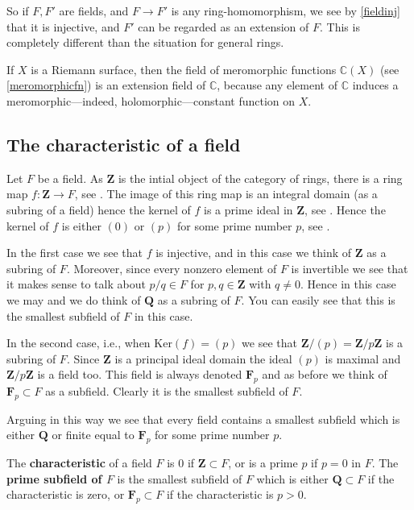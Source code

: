So if $F, F'$ are fields, and $F \to F'$ is any ring-homomorphism, we see by 
\cref{fieldinj} that it is injective, and $F'$ can be regarded as an extension
of $F$.
This is completely different than the situation for general rings. 


\begin{example} 
If $X$ is a Riemann surface, then the field of meromorphic functions
$\mathbb{C}(X)$ (see \cref{meromorphicfn}) is an extension field of
$\mathbb{C}$, because any element of $\mathbb{C}$ induces a
meromorphic---indeed, holomorphic---constant function on $X$.
\end{example} 



\subsection{The characteristic of a field}
\label{more-fields}

Let $F$ be a field. As $\mathbf{Z}$ is the intial object of the category of
rings, there is a ring map $f : \mathbf{Z} \to F$, see
.
The image of this ring map is an integral domain (as a subring of a field)
hence the kernel of $f$ is a prime ideal in $\mathbf{Z}$, see
.
Hence the kernel of $f$ is either $(0)$ or $(p)$ for some prime number $p$, see
.

In the first case we see that $f$ is injective, and in this case
we think of $\mathbf{Z}$ as a subring of $F$. Moreover, since every
nonzero element of $F$ is invertible we see that it makes sense to
talk about $p/q \in F$ for $p, q \in \mathbf{Z}$ with $q \not = 0$.
Hence in this case we may and we do think of $\mathbf{Q}$ as a subring of $F$.
You can easily see that this is the smallest subfield of $F$ in this case.

In the second case, i.e., when $\text{Ker}(f) = (p)$ we see that
$\mathbf{Z}/(p) = \mathbf{Z}/p\mathbf{Z}$ is a subring of $F$. Since
$\mathbf{Z}$ is a principal ideal domain the ideal $(p)$ is maximal
and $\mathbf{Z}/p\mathbf{Z}$ is a field too. This field is always denoted
$\mathbf{F}_p$ and as before we think of $\mathbf{F}_p \subset F$
as a subfield. Clearly it is the smallest subfield of $F$.

Arguing in this way we see that every field contains a smallest subfield
which is either $\mathbf{Q}$ or finite equal to $\mathbf{F}_p$ for some
prime number $p$.

\begin{definition}
The \textbf{characteristic} of a field $F$ is $0$ if
$\mathbf{Z} \subset F$, or is a prime $p$ if $p = 0$ in $F$.
The \textbf{prime subfield of $F$} is the smallest subfield of $F$
which is either $\mathbf{Q} \subset F$ if the characteristic is zero, or
$\mathbf{F}_p \subset F$ if the characteristic is $p > 0$.
\end{definition}

